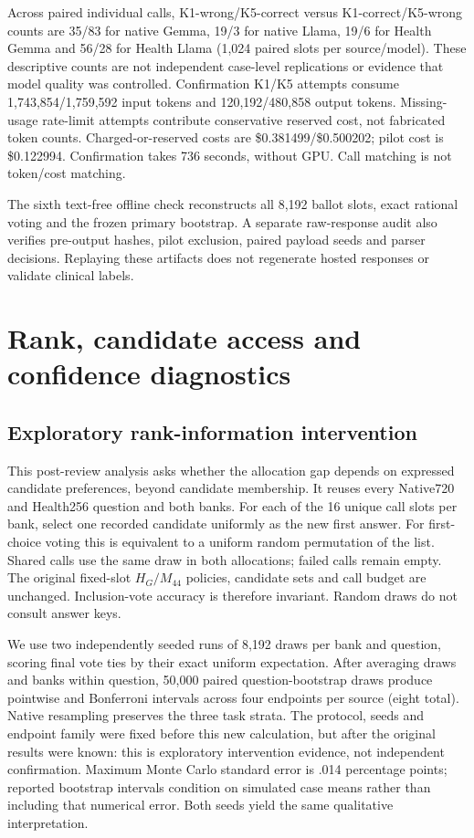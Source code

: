 Across paired individual calls, K1-wrong/K5-correct versus K1-correct/K5-wrong counts are 35/83 for native Gemma, 19/3 for native Llama, 19/6 for Health Gemma and 56/28 for Health Llama (1,024 paired slots per source/model). These descriptive counts are not independent case-level replications or evidence that model quality was controlled. Confirmation K1/K5 attempts consume 1,743,854/1,759,592 input tokens and 120,192/480,858 output tokens. Missing-usage rate-limit attempts contribute conservative reserved cost, not fabricated token counts. Charged-or-reserved costs are \$0.381499/\$0.500202; pilot cost is \$0.122994. Confirmation takes 736 seconds, without GPU. Call matching is not token/cost matching.

The sixth text-free offline check reconstructs all 8,192 ballot slots, exact rational voting and the frozen primary bootstrap. A separate raw-response audit also verifies pre-output hashes, pilot exclusion, paired payload seeds and parser decisions. Replaying these artifacts does not regenerate hosted responses or validate clinical labels.

\section{Rank, candidate access and confidence diagnostics}
\subsection{Exploratory rank-information intervention}\label{app:rank_information}

This post-review analysis asks whether the allocation gap depends on expressed candidate preferences, beyond candidate membership. It reuses every Native720 and Health256 question and both banks. For each of the 16 unique call slots per bank, select one recorded candidate uniformly as the new first answer. For first-choice voting this is equivalent to a uniform random permutation of the list. Shared calls use the same draw in both allocations; failed calls remain empty. The original fixed-slot $H_G/M_{44}$ policies, candidate sets and call budget are unchanged. Inclusion-vote accuracy is therefore invariant. Random draws do not consult answer keys.

We use two independently seeded runs of 8,192 draws per bank and question, scoring final vote ties by their exact uniform expectation. After averaging draws and banks within question, 50,000 paired question-bootstrap draws produce pointwise and Bonferroni intervals across four endpoints per source (eight total). Native resampling preserves the three task strata. The protocol, seeds and endpoint family were fixed before this new calculation, but after the original results were known: this is exploratory intervention evidence, not independent confirmation. Maximum Monte Carlo standard error is .014 percentage points; reported bootstrap intervals condition on simulated case means rather than including that numerical error. Both seeds yield the same qualitative interpretation.

